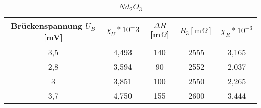 \begin{table}[h]
	\begin{center}
		\begin{tabular}{cc|ccc}
			Brückenspannung $U_B$ [mV]&$\chi_{U}*10^-3$ & $\Delta R$ [m$\Omega$]&$R_3[\text{m}\Omega]$&$\chi_R*10^{-3}$\\ \hline
			3,5	&4,493&140&2555&3,165\\
			2,8	&3,594&90&2552&2,037\\
			3	&3,851&100&2550&2,265\\
			3,7	&4,750&155&2600&3,444
		\end{tabular}
		\caption{$Nd_2O_3$}
		\label{tab2}
	\end{center}
\end{table}